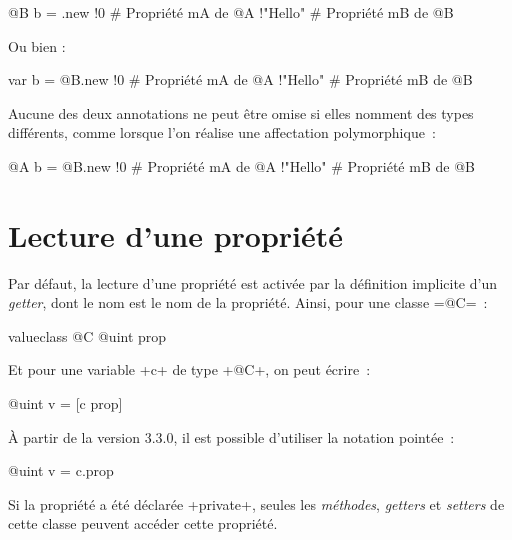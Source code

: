 \begin{galgas3}
@B b = .new {
  !0 # Propriété mA de @A
  !"Hello" # Propriété mB de @B
}
\end{galgas3}

Ou bien :
\begin{galgas3}
var b = @B.new {
  !0 # Propriété mA de @A
  !"Hello" # Propriété mB de @B
}
\end{galgas3}

Aucune des deux annotations ne peut être omise si elles nomment des types différents, comme lorsque l'on réalise une affectation polymorphique~:

\begin{galgas3}
@A b = @B.new {
  !0 # Propriété mA de @A
  !"Hello" # Propriété mB de @B
}
\end{galgas3}













\section{Lecture d'une propriété}

Par défaut, la lecture d'une propriété est activée par la définition implicite d'un \emph{getter}, dont le nom est le nom de la propriété. Ainsi, pour une classe \ggst=@C=~:

\begin{galgas3}
valueclass @C {
  @uint prop
}
\end{galgas3}

Et pour une variable \ggst+c+ de type \ggst+@C+, on peut écrire~:

\begin{galgas3}
@uint v = [c prop]
\end{galgas3}

À partir de la version 3.3.0, il est possible d'utiliser la notation pointée~:
\begin{galgas3}
@uint v = c.prop
\end{galgas3}

Si la propriété a été déclarée \ggst+private+, seules les \emph{méthodes}, \emph{getters} et \emph{setters} de cette classe peuvent accéder cette propriété.








